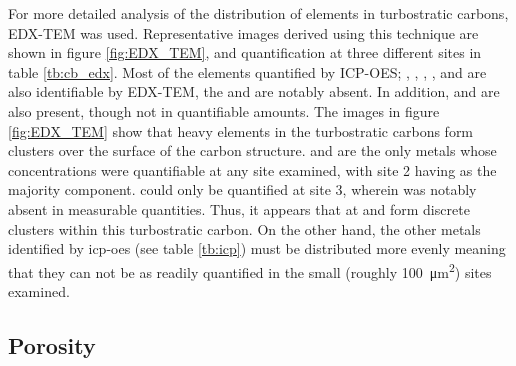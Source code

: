 For more detailed analysis of the distribution of elements in \glspl{turbostratic carbon}, EDX-TEM was used. Representative images derived using this technique are shown in figure \ref{fig:EDX_TEM}, and quantification at three different sites in table \ref{tb:cb_edx}. Most of the elements quantified by ICP-OES; , , , , and  are also identifiable by EDX-TEM, the  and  are notably absent. In addition,  and  are also present, though not in quantifiable amounts. The images in figure \ref{fig:EDX_TEM} show that heavy elements in the \glspl{turbostratic carbon} form clusters over the surface of the carbon structure.  and  are the only metals whose concentrations were quantifiable at any site examined, with site 2 having  as the majority component.  could only be quantified at site 3, wherein  was notably absent in measurable quantities. Thus, it appears that at  and  form discrete clusters within this \gls{turbostratic carbon}. On the other hand, the other metals identified by \acrshort{icp-oes} (see table \ref{tb:icp}) must be distributed more evenly meaning that they can not be as readily quantified in the small (roughly \qty{100}{\micro\metre\squared}) sites examined.


\subsection{Porosity}

